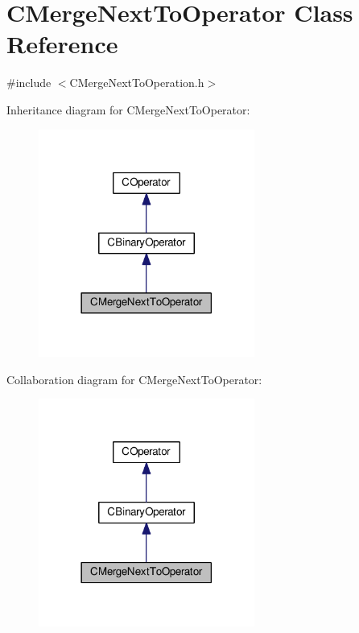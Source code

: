 \hypertarget{classCMergeNextToOperator}{}\section{C\+Merge\+Next\+To\+Operator Class Reference}
\label{classCMergeNextToOperator}


{\ttfamily \#include $<$C\+Merge\+Next\+To\+Operation.\+h$>$}



Inheritance diagram for C\+Merge\+Next\+To\+Operator\+:\nopagebreak
\begin{figure}[H]
\begin{center}
\leavevmode
\includegraphics[width=201pt]{classCMergeNextToOperator__inherit__graph}
\end{center}
\end{figure}


Collaboration diagram for C\+Merge\+Next\+To\+Operator\+:\nopagebreak
\begin{figure}[H]
\begin{center}
\leavevmode
\includegraphics[width=201pt]{classCMergeNextToOperator__coll__graph}
\end{center}
\end{figure}
